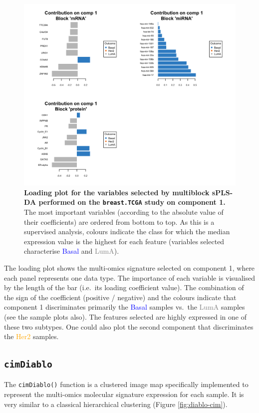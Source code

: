 \documentclass[]{book}
\begin{document}
\begin{figure}

{\centering \includegraphics[width=0.5\linewidth]{Figures/DIABLO/diablo-loading-1} 

}

\caption{\textbf{Loading plot for the variables selected by
multiblock sPLS-DA performed on the \texttt{breast.TCGA} study on
component 1.} The most important variables (according to the absolute
value of their coefficients) are ordered from bottom to top. As this is
a supervised analysis, colours indicate the class for which the median
expression value is the highest for each feature (variables selected
characterise \textcolor{blue}{Basal} and \textcolor{grey}{LumA}).}\label{fig:diablo-loading}
\end{figure}









The loading plot shows the multi-omics signature selected on component
1, where each panel represents one data type. The importance of each
variable is visualised by the length of the bar (i.e.~its loading
coefficient value). The combination of the sign of the coefficient
(positive / negative) and the colours indicate that component 1
discriminates primarily the \textcolor{blue}{Basal} samples vs.~the
\textcolor{grey}{LumA} samples (see the sample plots also). The features
selected are highly expressed in one of these two subtypes. One could
also plot the second component that discriminates the
\textcolor{orange}{Her2} samples.

\subsection{\texorpdfstring{\texttt{cimDiablo}}{cimDiablo}}\label{cimdiablo}

The \texttt{cimDiablo()} function is a clustered image map specifically
implemented to represent the multi-omics molecular signature expression
for each sample. It is very similar to a classical hierarchical
clustering (Figure \ref{fig:diablo-cim}).
\end{document}
